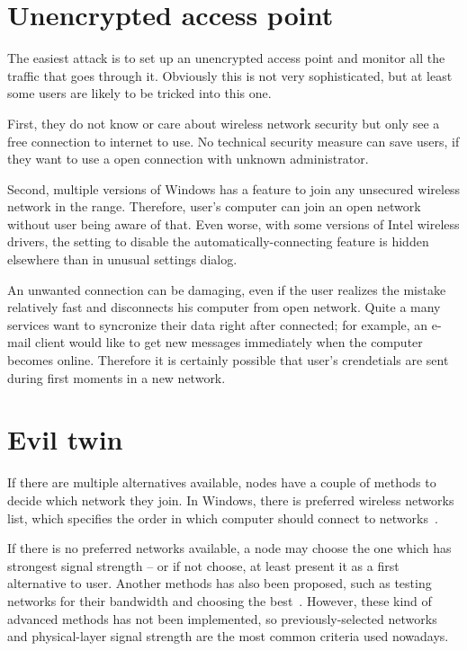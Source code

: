 \documentclass[12pt,a4paper,oneside,pdftex]{report}
\begin{document}
\section{Unencrypted access point}

The easiest attack is to set up an unencrypted access point and monitor all the traffic that goes through it. Obviously this is not very sophisticated, but at least some users are likely to be tricked into this one.

First, they do not know or care about wireless network security but only see a free connection to internet to use. No technical security measure can save users, if they want to use a open connection with unknown administrator.

Second, multiple versions of Windows has a feature to join any unsecured wireless network in the range. Therefore, user's computer can join an open network without user being aware of that. Even worse, with some versions of Intel wireless drivers, the setting to disable the automatically-connecting feature is hidden elsewhere than in unusual settings dialog.~\cite{windows_wifi_answers}

An unwanted connection can be damaging, even if the user realizes the mistake relatively fast and disconnects his computer from open network. Quite a many services want to syncronize their data right after connected; for example, an e-mail client would like to get new messages immediately when the computer becomes online. Therefore it is certainly possible that user's crendetials are sent during first moments in a new network.

\section{Evil twin}

If there are multiple alternatives available, nodes have a couple of methods to decide which network they join. In Windows, there is preferred wireless networks list, which specifies the order in which computer should connect to networks~\cite{windows_wifi_preferred}. 

If there is no preferred networks available, a node may choose the one which has strongest signal strength -- or if not choose, at least present it as a first alternative to user. Another methods has also been proposed, such as testing networks for their bandwidth and choosing the best~\cite{Nicholson:2006:APselection}. However, these kind of advanced methods has not been implemented, so previously-selected networks and physical-layer signal strength are the most common criteria used nowadays.
\end{document}
